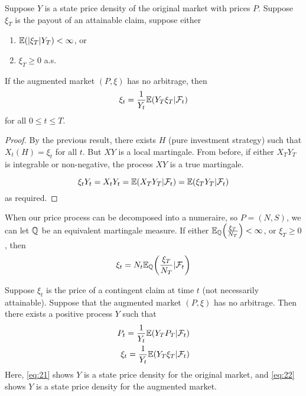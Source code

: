\begin{thm}
  \label{defn:discrete_time_models:22}
  Suppose $Y$ is a state price density of the original market with
  prices $P$.  Suppose $\xi_{T}$ is the payout of an attainable claim,
  suppose either
  \begin{enumerate}
  \item $\E{|\xi_{T}|Y_{T}} < \infty$, or
  \item $\xi_{T} \geq 0$ a.s.
  \end{enumerate}

  If the augmented market $(P, \xi)$ has no arbitrage, then
  \begin{equation}
    \label{eq:18}
    \xi_{t} = \frac{1}{Y_{t}} \E{Y_{T} \xi_{T} | \mathcal{F}_{t}}
  \end{equation} for all $0 \leq t \leq T$.
\end{thm}

\begin{proof}
  By the previous result, there exists $H$ (pure investment strategy)
  such that $X_{t}(H) = \xi_{t}$ for all $t$.  But $XY$ is a local
  martingale.  From before, if either $X_{T} Y_{T}$ is integrable or
  non-negative, the process $XY$ is a true martingale.

  \begin{equation}
    \label{eq:19}
    \xi_{t} Y_{t} = X_{t} Y_{t} = \E{X_{T} Y_{T} | \mathcal{F}_{t}} =
    \E{\xi_{T} Y_{T} | \mathcal{F}_{t}}
  \end{equation} as required.
\end{proof}

\begin{remark}
  When our price process can be decomposed into a numeraire, so $P =
  (N, S)$, we can let $\Q$ be an equivalent martingale measure.  If
  either $\E{\frac{\xi_{T}}{N_{T}}}{\Q} < \infty$, or $\xi_{T} \geq 0$,
  then
  \begin{equation}
    \label{eq:20}
    \xi_{t} = N_{t} \E{\frac{\xi_{T}}{N_{T}} | \mathcal{F}_{t}}{\Q}
  \end{equation}
\end{remark}

\begin{thm}
  \label{defn:discrete_time_models:23}
  Suppose $\xi_{t}$ is the price of a contingent claim at time $t$
  (not necessarily attainable).  Suppose that the augmented market
  $(P, \xi)$ has no arbitrage.  Then there exists a positive process
  $Y$ such that
  \begin{align}
    \label{eq:21}
    P_{t} = \frac{1}{Y_{t}} \E{Y_{T} P_{T} | \mathcal{F}_{t}} \\
    \label{eq:22}
    \xi_{t} = \frac{1}{Y_{t}} \E{Y_{T} \xi_{T} | \mathcal{F}_{t}}
  \end{align}
  Here, \eqref{eq:21} shows $Y$ is a state price density for the original
  market, and \eqref{eq:22} shows $Y$ is a state price density for the
  augmented market.
\end{thm}

